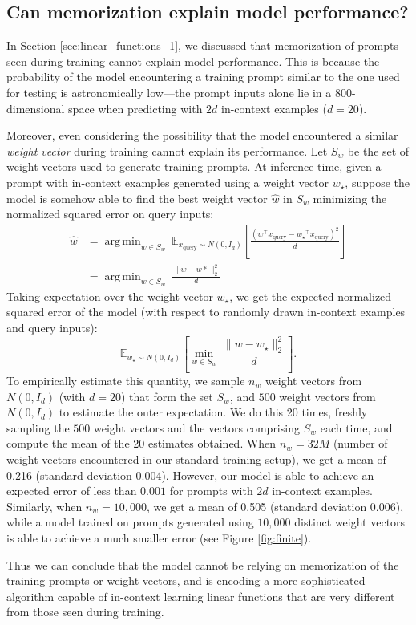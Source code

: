 \documentclass{article}
\DeclareMathOperator*{\argmin}{arg\,min}
\begin{document}
\clearpage
\subsection{Can memorization explain model performance?} 
\label{app:memorization}
In Section \ref{sec:linear_functions_1}, we discussed that memorization of prompts seen during training cannot explain model performance. 
This is because the probability of the model encountering a training prompt similar to the one used for testing is astronomically low---the prompt inputs alone lie in a 800-dimensional space when predicting with $2d$ in-context examples ($d=20$).

Moreover, even considering the possibility that the model encountered a similar \emph{weight vector} during training cannot explain its performance.
Let $S_w$ be the set of weight vectors used to generate training prompts. At inference time, given a prompt with in-context examples generated using a weight vector $w_\star$, suppose the model is somehow able to find the best weight vector $\hat{w}$ in $S_w$ minimizing the normalized squared error on query inputs:
\begin{align*}
\hat{w} &= \argmin_{w \in S_w} \ \mathds{E}_{x_{\text{query}} \sim N(0, I_d)} \left[\frac{(w^\top x_{\text{query}} - {w_\star}^\top x_{\text{query}}  )^2}{d} \right] \\
&= \argmin_{w \in S_w} \ \frac{ \lVert w - w* \rVert ^2_2}{d}
\end{align*}
Taking expectation over the weight vector $w_\star$, we get the expected normalized squared error of the model (with respect to randomly drawn in-context examples and query inputs):
\[
\mathds{E}_{{w_\star \sim N(0, I_d)}} \left[ \min_{w \in S_w} \ \frac{ \lVert w - w_\star \rVert ^2_2}{d} \right].
\]
To empirically estimate this quantity, we sample $n_w$ weight vectors from $N(0, I_d)$ (with $d = 20$) that form the set $S_w$, and $500$ weight vectors from $N(0, I_d)$ to estimate the outer expectation. We do this 20 times, freshly sampling the $500$ weight vectors and the vectors comprising $S_w$ each time, and compute the mean of the 20 estimates obtained. 
When $n_w = 32M$ (number of weight vectors encountered in our standard training setup), we get a mean of 0.216 (standard deviation 0.004). However, our model is able to achieve an expected error of less than $0.001$ for prompts with $2d$ in-context examples.
Similarly, when $n_w = 10,000$, we get a mean of 0.505 (standard deviation 0.006), while a model trained on prompts generated using $10,000$ distinct weight vectors is able to achieve a much smaller error (see Figure \ref{fig:finite}). 

Thus we can conclude that the model cannot be relying on memorization
of the training prompts or weight vectors, and is encoding a more sophisticated algorithm capable of in-context
learning linear functions that are very different from those seen during training.
\end{document}
